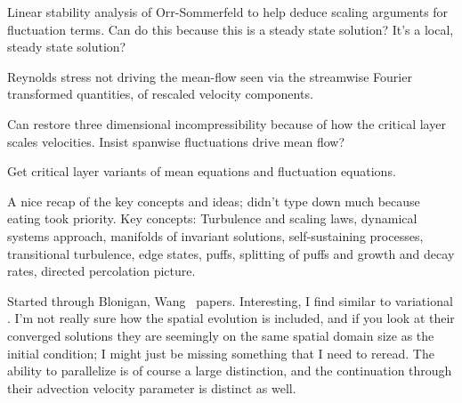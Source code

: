 \begin{description}
{\begin{description}
Linear stability analysis of Orr-Sommerfeld to help deduce scaling arguments for fluctuation
terms. Can do this because this is a steady state solution? It's a local, steady state solution?

Reynolds stress not driving the mean-flow seen via the streamwise Fourier transformed quantities,
of rescaled velocity components.

Can restore three dimensional incompressibility because of how the critical layer scales velocities.
Insist spanwise fluctuations drive mean flow?

Get critical layer variants of mean equations and fluctuation equations.
\item[Turbulence \`a la D. Barkley]
A nice recap of the key concepts and ideas; didn't type down much because eating took
priority. Key concepts: Turbulence and scaling laws, dynamical systems approach, manifolds of invariant solutions, self-sustaining
processes, transitional turbulence, edge states, puffs, splitting of puffs and growth and decay rates, directed percolation picture.

\item[Reading]
Started through Blonigan, Wang \etal\
papers. Interesting, I find
\refref{WGBGQ13} similar to variational {\descent}. I'm not really
sure how the spatial evolution is included, and if you look at their
converged solutions they are seemingly on the same spatial domain size as
the initial condition; I might just be missing something that I need to
reread. The ability to parallelize is of course a large distinction, and
the continuation through their advection velocity parameter is distinct
as well.

\end{description}
}

\end{description}
